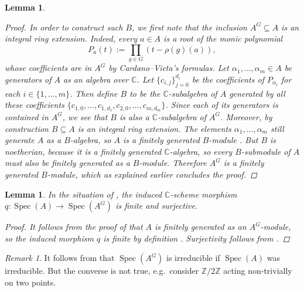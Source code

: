\documentclass[12pt,a4paper]{amsart}
\theoremstyle{plain}
\newtheorem{lm}[thm]{Lemma}
\theoremstyle{definition}
\theoremstyle{remark}
\newtheorem{rem}[thm]{Remark}
\begin{document}
\begin{lm}
\begin{proof}
    In order to construct such $B$, we first note that the inclusion $A^{G} \subseteq A$ is an integral ring extension.
    Indeed, every $a \in A$ is a root of the monic polynomial
    \[ P_{a}(t) := \prod_{g \in G}(t - \rho(g)(a)), \]
    whose coefficients are in $A^{G}$ by Cardano--Vieta's formulas.
    Let $\alpha_{1}, \ldots, \alpha_{m} \in A$ be generators of $A$ as an algebra over $\mathbb{C}$.
    Let $\{ c_{i,j} \}_{j = 0}^{d_{i}}$ be the coefficients of $P_{\alpha_{i}}$ for each $i \in \{1, \ldots, m\}$.
    Then define $B$ to be the $\mathbb{C}$-subalgebra of $A$ generated by all these coefficients $\{ c_{1,0}, \ldots, c_{1,d_{1}}, c_{2,0}, \ldots, c_{m,d_{m}} \}$.
    Since each of its generators is contained in $A^{G}$, we see that $B$ is also a $\mathbb{C}$-subalgebra of $A^{G}$.
    Moreover, by construction $B \subseteq A$ is an integral ring extension.
    The elements $\alpha_{1}, \ldots, \alpha_{m}$ still generate $A$ as a $B$-algebra, so $A$ is a finitely generated $B$-module \cite[Corollary 5.2]{am69}.
    But $B$ is noetherian, because it is a finitely generated $\mathbb{C}$-algebra, so every $B$-submodule of $A$ must also be finitely generated as a $B$-module.
    Therefore $A^{G}$ is a finitely generated $B$-module, which as explained earlier concludes the proof.
  \end{proof}

\end{lm}

\begin{lm}\label{lm:finitesurjective}
  In the situation of , the induced $\mathbb{C}$-scheme morphism $q \colon \operatorname{Spec}(A) \to \operatorname{Spec}(A^{G})$ is finite and surjective.

  \begin{proof}
    It follows from the proof of  that $A$ is finitely generated as an $A^{G}$-module, so the induced morphism $q$ is finite by definition \cite[p.~84]{har77}.
    Surjectivity follows from \cite[\href{https://stacks.math.columbia.edu/tag/00GQ}{Tag 00GQ}]{stacks-project}.
  \end{proof}
\end{lm}

\begin{rem}\label{rem:irreducible}
  It follows from  that $\operatorname{Spec}(A^{G})$ is irreducible if $\operatorname{Spec}(A)$ was irreducible.
  But the converse is not true, e.g.~consider $\mathbb{Z}/2\mathbb{Z}$ acting non-trivially on two points.
\end{rem}
\end{document}

